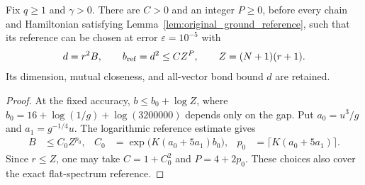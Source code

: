 \begin{lemma}
    \label{lem:original_ground_reference_polynomial}
    \leanok
    Fix $q\ge1$ and $\gamma>0$. There are $C>0$ and an integer $P\ge0$,
    before every chain and Hamiltonian satisfying
    Lemma~\ref{lem:original_ground_reference}, such that its reference can
    be chosen at error $\varepsilon=10^{-5}$ with
    \begin{align}
        d=r^2B,\qquad b_{\rm ref}=d^2\le C Z^P,
        \qquad Z=(N+1)(r+1).
        \label{eq:original_reference_polynomial}
    \end{align}
    Its dimension, mutual closeness, and all-vector bond bound $d$ are
    retained.
\end{lemma}
\begin{proof}\leanok
    At the fixed accuracy, $b\le b_0+\log Z$, where
    $b_0=16+\log(1/g)+\log(3200000)$ depends only on the gap.
    Put $a_0=u^3/g$ and $a_1=g^{-1/4}u$. The logarithmic reference
    estimate gives
    \begin{align*}
        B & \le C_0 Z^{p_0},
          & C_0              & =\exp\bigl(K(a_0+5a_1)b_0\bigr),
          & p_0              & =\lceil K(a_0+5a_1)\rceil.
    \end{align*}
    Since $r\le Z$, one may take $C=1+C_0^2$ and $P=4+2p_0$.
    These choices also cover the exact flat-spectrum reference.
\end{proof}

